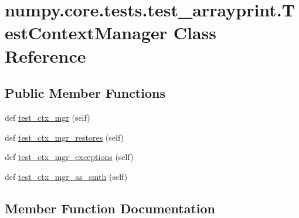\hypertarget{classnumpy_1_1core_1_1tests_1_1test__arrayprint_1_1TestContextManager}{}\section{numpy.\+core.\+tests.\+test\+\_\+arrayprint.\+Test\+Context\+Manager Class Reference}
\label{classnumpy_1_1core_1_1tests_1_1test__arrayprint_1_1TestContextManager}
\subsection*{Public Member Functions}
\begin{DoxyCompactItemize}
\item 
def \hyperlink{classnumpy_1_1core_1_1tests_1_1test__arrayprint_1_1TestContextManager_a04906bd4094c0fe36a9e082f0372b5f4}{test\+\_\+ctx\+\_\+mgr} (self)
\item 
def \hyperlink{classnumpy_1_1core_1_1tests_1_1test__arrayprint_1_1TestContextManager_a6159e0b601aadedd4e97205a57cc136e}{test\+\_\+ctx\+\_\+mgr\+\_\+restores} (self)
\item 
def \hyperlink{classnumpy_1_1core_1_1tests_1_1test__arrayprint_1_1TestContextManager_a24674b91c874395a97dfd8b024847b84}{test\+\_\+ctx\+\_\+mgr\+\_\+exceptions} (self)
\item 
def \hyperlink{classnumpy_1_1core_1_1tests_1_1test__arrayprint_1_1TestContextManager_a13be21f9823129c964de1cbbdd3edb56}{test\+\_\+ctx\+\_\+mgr\+\_\+as\+\_\+smth} (self)
\end{DoxyCompactItemize}


\subsection{Member Function Documentation}
\mbox{\label{classnumpy_1_1core_1_1tests_1_1test__arrayprint_1_1TestContextManager_a04906bd4094c0fe36a9e082f0372b5f4}} 

